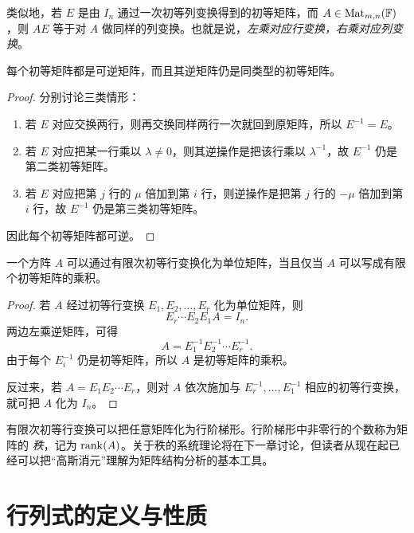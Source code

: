 \begin{remark}
类似地，若 $E$ 是由 $I_n$ 通过一次初等列变换得到的初等矩阵，而 $A\in\mathrm{Mat}_{m,n}(\mathbb{F})$，则 $AE$ 等于对 $A$ 做同样的列变换。也就是说，\emph{左乘对应行变换，右乘对应列变换}。
\end{remark}

\begin{proposition}[初等矩阵可逆]
每个初等矩阵都是可逆矩阵，而且其逆矩阵仍是同类型的初等矩阵。
\end{proposition}

\begin{proof}
分别讨论三类情形：
\begin{enumerate}[label=(\arabic*)]
  \item 若 $E$ 对应交换两行，则再交换同样两行一次就回到原矩阵，所以 $E^{-1}=E$。
  \item 若 $E$ 对应把某一行乘以 $\lambda\ne 0$，则其逆操作是把该行乘以 $\lambda^{-1}$，故 $E^{-1}$ 仍是第二类初等矩阵。
  \item 若 $E$ 对应把第 $j$ 行的 $\mu$ 倍加到第 $i$ 行，则逆操作是把第 $j$ 行的 $-\mu$ 倍加到第 $i$ 行，故 $E^{-1}$ 仍是第三类初等矩阵。
\end{enumerate}
因此每个初等矩阵都可逆。
\end{proof}

\begin{proposition}
一个方阵 $A$ 可以通过有限次初等行变换化为单位矩阵，当且仅当 $A$ 可以写成有限个初等矩阵的乘积。
\end{proposition}

\begin{proof}
若 $A$ 经过初等行变换 $E_1,E_2,\dots,E_r$ 化为单位矩阵，则
\[
E_r\cdots E_2E_1A=I_n.
\]
两边左乘逆矩阵，可得
\[
A=E_1^{-1}E_2^{-1}\cdots E_r^{-1}.
\]
由于每个 $E_i^{-1}$ 仍是初等矩阵，所以 $A$ 是初等矩阵的乘积。

反过来，若 $A=E_1E_2\cdots E_r$，则对 $A$ 依次施加与 $E_r^{-1},\dots,E_1^{-1}$ 相应的初等行变换，就可把 $A$ 化为 $I_n$。
\end{proof}

\begin{remark}
有限次初等行变换可以把任意矩阵化为行阶梯形。行阶梯形中非零行的个数称为矩阵的 \emph{秩}，记为 $\operatorname{rank}(A)$。关于秩的系统理论将在下一章讨论，但读者从现在起已经可以把“高斯消元”理解为矩阵结构分析的基本工具。
\end{remark}

\section{行列式的定义与性质}

